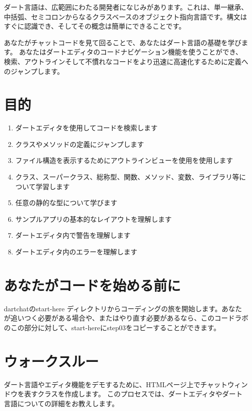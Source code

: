 
ダート言語は、広範囲にわたる開発者になじみがあります。これは、単一継承、中括弧、セミコロンからなるクラスベースのオブジェクト指向言語です。構文はすぐに認識でき、そしてその概念は簡単にできることです。

あなたがチャットコードを見て回ることで、あなたはダート言語の基礎を学びます。 あなたはダートエディタのコードナビゲーション機能を使うことができ、検索、アウトラインそして不慣れなコードをより迅速に高速化するために定義へのジャンプします。

\section{目的}

\begin{enumerate}
\item ダートエディタを使用してコードを検索します
\item クラスやメソッドの定義にジャンプします
\item ファイル構造を表示するためにアウトラインビューを使用を使用します
\item クラス、スーパークラス、総称型、関数、メソッド、変数、ライブラリ等について学習します
\item 任意の静的な型について学びます
\item サンプルアプリの基本的なレイアウトを理解します
\item ダートエディタ内で警告を理解します
\item ダートエディタ内のエラーを理解します
\end{enumerate}

\section{あなたがコードを始める前に}

dartchatのstart-here ディレクトリからコーディングの旅を開始します。あなたが追いつく必要がある場合や、またはやり直す必要があるなら、このコードラボのこの部分に対して、start-hereにstep03をコピーすることができます。

\section{ウォークスルー}

ダート言語やエディタ機能をデモするために、HTMLページ上でチャットウィンドウを表すクラスを作成します。 このプロセスでは、ダートエディタやダート言語についての詳細をお教えします。

